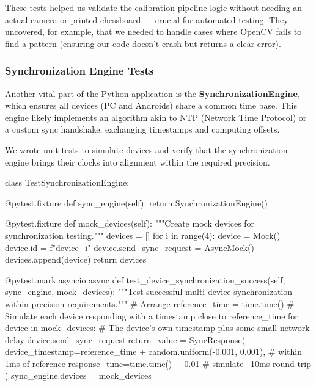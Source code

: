 \documentclass[11pt,a4paper]{report}
\begin{document}
These tests helped us validate the calibration pipeline logic without
needing an actual camera or printed chessboard --- crucial for automated
testing. They uncovered, for example, that we needed to handle cases
where OpenCV fails to find a pattern (ensuring our code doesn't crash
but returns a clear error).

\subsubsection{Synchronization Engine Tests}

Another vital part of the Python application is the
\textbf{SynchronizationEngine}, which ensures all devices (PC and Androids)
share a common time base. This engine likely implements an algorithm
akin to NTP (Network Time Protocol) or a custom sync handshake,
exchanging timestamps and computing offsets.

We wrote unit tests to simulate devices and verify that the
synchronization engine brings their clocks into alignment within the
required precision.

    class TestSynchronizationEngine:

        @pytest.fixture
        def sync\_engine(self):
            return SynchronizationEngine()

        @pytest.fixture
        def mock\_devices(self):
            """Create mock devices for synchronization testing."""
            devices = []
            for i in range(4):
                device = Mock()
                device.id = f"device_{i}"
                device.send\_sync\_request = AsyncMock()
                devices.append(device)
            return devices

        @pytest.mark.asyncio
        async def test\_device\_synchronization\_success(self, sync\_engine, mock\_devices):
            """Test successful multi-device synchronization within precision requirements."""
            # Arrange
            reference\_time = time.time()
            # Simulate each device responding with a timestamp close to reference\_time
            for device in mock\_devices:
                # The device's own timestamp plus some small network delay
                device.send\_sync\_request.return\_value = SyncResponse(
                    device\_timestamp=reference\_time + random.uniform(-0.001, 0.001),  # within 1ms of reference
                    response\_time=time.time() + 0.01  # simulate ~10ms round-trip
                )
            sync\_engine.devices = mock\_devices
\end{document}
